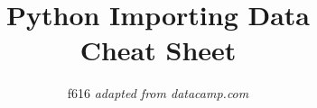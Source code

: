 \documentclass[10pt,a4paper]{article}
\title{{\color{alert} Python Importing Data }\textbf {\color{black}\\Cheat Sheet}}
\author{f616 \emph{adapted from datacamp.com}}
\date{}
\begin{document}
\small
\begin{multicols}{2}

\maketitle
\thispagestyle{empty}
\scriptsize






\end{multicols}
\end{document}
